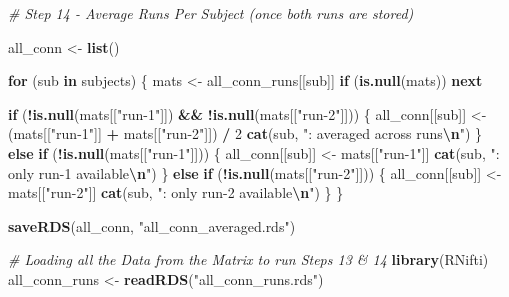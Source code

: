 \documentclass[
]{article}
\newenvironment{Shaded}{\begin{snugshade}}{\end{snugshade}}
\newcommand{\CommentTok}[1]{\textcolor[rgb]{0.56,0.35,0.01}{\textit{#1}}}
\newcommand{\ControlFlowTok}[1]{\textcolor[rgb]{0.13,0.29,0.53}{\textbf{#1}}}
\newcommand{\DecValTok}[1]{\textcolor[rgb]{0.00,0.00,0.81}{#1}}
\newcommand{\FunctionTok}[1]{\textcolor[rgb]{0.13,0.29,0.53}{\textbf{#1}}}
\newcommand{\NormalTok}[1]{#1}
\newcommand{\OtherTok}[1]{\textcolor[rgb]{0.56,0.35,0.01}{#1}}
\newcommand{\SpecialCharTok}[1]{\textcolor[rgb]{0.81,0.36,0.00}{\textbf{#1}}}
\newcommand{\StringTok}[1]{\textcolor[rgb]{0.31,0.60,0.02}{#1}}
\begin{document}
\begin{Shaded}
\begin{Highlighting}[]
\CommentTok{\# Step 14 {-} Average Runs Per Subject (once both runs are stored)}

\NormalTok{all\_conn }\OtherTok{\textless{}{-}} \FunctionTok{list}\NormalTok{()}

\ControlFlowTok{for}\NormalTok{ (sub }\ControlFlowTok{in}\NormalTok{ subjects) \{}
\NormalTok{  mats }\OtherTok{\textless{}{-}}\NormalTok{ all\_conn\_runs[[sub]]}
  \ControlFlowTok{if}\NormalTok{ (}\FunctionTok{is.null}\NormalTok{(mats)) }\ControlFlowTok{next}
  
  \ControlFlowTok{if}\NormalTok{ (}\SpecialCharTok{!}\FunctionTok{is.null}\NormalTok{(mats[[}\StringTok{"run{-}1"}\NormalTok{]]) }\SpecialCharTok{\&\&} \SpecialCharTok{!}\FunctionTok{is.null}\NormalTok{(mats[[}\StringTok{"run{-}2"}\NormalTok{]])) \{}
\NormalTok{    all\_conn[[sub]] }\OtherTok{\textless{}{-}}\NormalTok{ (mats[[}\StringTok{"run{-}1"}\NormalTok{]] }\SpecialCharTok{+}\NormalTok{ mats[[}\StringTok{"run{-}2"}\NormalTok{]]) }\SpecialCharTok{/} \DecValTok{2}
    \FunctionTok{cat}\NormalTok{(sub, }\StringTok{": averaged across runs}\SpecialCharTok{\textbackslash{}n}\StringTok{"}\NormalTok{)}
\NormalTok{  \} }\ControlFlowTok{else} \ControlFlowTok{if}\NormalTok{ (}\SpecialCharTok{!}\FunctionTok{is.null}\NormalTok{(mats[[}\StringTok{"run{-}1"}\NormalTok{]])) \{}
\NormalTok{    all\_conn[[sub]] }\OtherTok{\textless{}{-}}\NormalTok{ mats[[}\StringTok{"run{-}1"}\NormalTok{]]}
    \FunctionTok{cat}\NormalTok{(sub, }\StringTok{": only run{-}1 available}\SpecialCharTok{\textbackslash{}n}\StringTok{"}\NormalTok{)}
\NormalTok{  \} }\ControlFlowTok{else} \ControlFlowTok{if}\NormalTok{ (}\SpecialCharTok{!}\FunctionTok{is.null}\NormalTok{(mats[[}\StringTok{"run{-}2"}\NormalTok{]])) \{}
\NormalTok{    all\_conn[[sub]] }\OtherTok{\textless{}{-}}\NormalTok{ mats[[}\StringTok{"run{-}2"}\NormalTok{]]}
    \FunctionTok{cat}\NormalTok{(sub, }\StringTok{": only run{-}2 available}\SpecialCharTok{\textbackslash{}n}\StringTok{"}\NormalTok{)}
\NormalTok{  \}}
\NormalTok{\}}

\FunctionTok{saveRDS}\NormalTok{(all\_conn, }\StringTok{"all\_conn\_averaged.rds"}\NormalTok{)}

\CommentTok{\# Loading all the Data from the Matrix to run Steps 13 \& 14}
\FunctionTok{library}\NormalTok{(RNifti)}
\NormalTok{all\_conn\_runs }\OtherTok{\textless{}{-}} \FunctionTok{readRDS}\NormalTok{(}\StringTok{"all\_conn\_runs.rds"}\NormalTok{)}
\end{Highlighting}
\end{Shaded}
\end{document}

